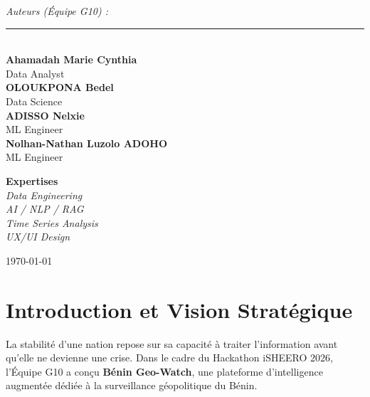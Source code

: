 \documentclass[12pt,a4paper]{article}
\begin{document}
\begin{titlepage}
    \vspace{1cm}
    \begin{minipage}{0.5\textwidth}
        \begin{flushleft} \large
            \emph{Auteurs (Équipe G10) :}\\
            \rule{6cm}{0.5pt} \\
            \textbf{Ahamadah Marie Cynthia} \\ \small Data Analyst \\
            \vspace{0.2cm}
            \textbf{OLOUKPONA Bedel} \\ \small Data Science \\
            \vspace{0.2cm}
            \textbf{ADISSO Nelxie} \\ \small ML Engineer \\
            \vspace{0.2cm}
            \textbf{Nolhan-Nathan Luzolo ADOHO} \\ \small ML Engineer
        \end{flushleft}
    \end{minipage}
    \hfill
    \begin{minipage}{0.4\textwidth}
        \begin{flushright} \large
            \textbf{Expertises} \\
            \small
            \textit{Data Engineering} \\
            \textit{AI / NLP / RAG} \\
            \textit{Time Series Analysis} \\
            \textit{UX/UI Design}
        \end{flushright}
    \end{minipage}
    
    \vfill
    {\large \today}
\end{titlepage}

\newpage
\tableofcontents
\newpage

\section{Introduction et Vision Stratégique}
La stabilité d'une nation repose sur sa capacité à traiter l'information avant qu'elle ne devienne une crise. Dans le cadre du Hackathon iSHEERO 2026, l'Équipe G10 a conçu \textbf{Bénin Geo-Watch}, une plateforme d'intelligence augmentée dédiée à la surveillance géopolitique du Bénin.
\end{document}
